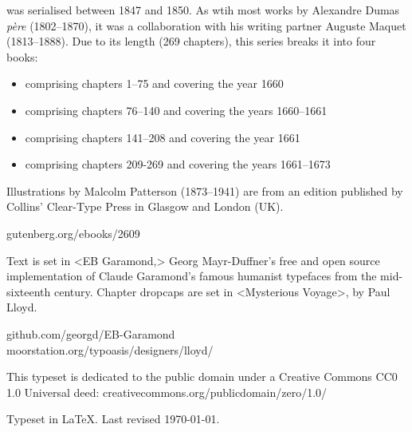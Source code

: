 \documentclass[
a5paper,
]{scrbook}
\begin{document}
\centering
\vfill
\begin{minipage}{\textwidth}
 was serialised between 1847 and 1850.  As wtih most works by Alexandre Dumas \textit{père} (1802--1870), it was a collaboration with his writing partner Auguste Maquet (1813--1888). Due to its length (269 chapters), this series breaks it into four books:
\begin{itemize}[noitemsep]
\item {} comprising chapters 1--75 and covering the year 1660
\item  {} comprising chapters 76--140 and covering the years 1660--1661
\item {} comprising chapters 141--208 and covering the year 1661
\item {} comprising chapters 209-269 and covering the years 1661--1673
\end{itemize}
Illustrations by Malcolm Patterson (1873--1941) are from an edition published by Collins' Clear-Type Press in Glasgow and London (UK).
\end{minipage}
\vfill
gutenberg.org/ebooks/2609
\vfill
\divider
\vfill
\begin{minipage}{\textwidth}
Text is set in <EB Garamond,> Georg Mayr-Duffner's free and open source implementation of Claude Garamond’s famous humanist typefaces from the mid-sixteenth century. Chapter dropcaps are set in <Mysterious Voyage>, by Paul Lloyd.
\end{minipage}
\vfill
github.com/georgd/EB-Garamond\\moorstation.org/typoasis/designers/lloyd/
\vfill
\divider
\vfill
\begin{minipage}{\textwidth}
This typeset is dedicated to the public domain under a Creative Commons CC0 1.0 Universal deed: creativecommons.org/publicdomain/zero/1.0/\\
\end{minipage}
\vfill
\divider
\vfill
Typeset in \LaTeX{}. Last revised \today.
\thispagestyle{empty}
\end{document}
